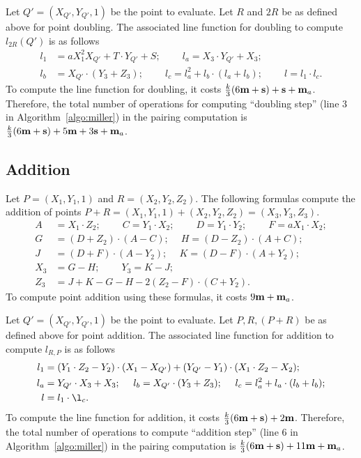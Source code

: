 Let $Q' = (X_{Q'}, Y_{Q'}, 1)$ be the point to evaluate.
Let $R$ and $2R$ be as defined above for point doubling.
The associated line function for doubling
to compute $l_{2R}(Q')$ is as follows
\begin{align*}
l_1 &= a X_1^2 X_{Q'} + T \cdot Y_{Q'} + S;\		\qquad
l_a = X_3 \cdot Y_{Q'} + X_3;			\\
l_b &= X_{Q'} \cdot (Y_3 + Z_3);\			\qquad
l_c = l_a^2 + l_b \cdot (l_a + l_b);\		\qquad
l = l_1 \cdot l_c.
\end{align*}
To compute the line function for doubling,
it costs 
$\frac{k}{3}(6\textbf{m} + \textbf{s}) + \textbf{s} + \textbf{m}_{a}$. %
Therefore, the total number of operations for computing ``doubling step''
({line 3} in Algorithm~\ref{algo:miller}) in the pairing computation is
$\frac{k}{3}(6\textbf{m} + \textbf{s}) + 5\textbf{m} +3\textbf{s} + \textbf{m}_{a}$. %



\subsection{Addition}
Let $P = (X_1,Y_1,1)$ and $R = (X_2,Y_2,Z_2)$.
The following formulas compute the addition of points
$P + R = (X_1,Y_1,1) + (X_2,Y_2,Z_2) = (X_3,Y_3,Z_3)$.
\begin{align*}
A &= X_1 \cdot Z_2;\	\qquad
C = Y_1 \cdot X_2;\	\qquad
D = Y_1 \cdot Y_2;\	\qquad
F = a X_1 \cdot X_2;\\
G &= (D + Z_2) \cdot (A - C);\	\quad
H = (D - Z_2) \cdot (A + C);\\
J &= (D + F) \cdot (A - Y_2);\	\quad
K = (D - F) \cdot (A + Y_2);\\
X_3 &= G - H;\	\qquad
Y_3 = K - J;\\
Z_3 &= J + K - G - H - 2(Z_2 - F) \cdot (C + Y_2).
\end{align*}
To compute point addition using these formulas,
it costs $9\textbf{m} + \textbf{m}_{a}$. %

Let $Q' = (X_{Q'},Y_{Q'},1)$ be the point to evaluate.
Let $P,R,(P+R)$ be as defined above for point addition.
The associated line function for addition
to compute $l_{R,P}$ is as follows
\begin{align*}
l_1 &= (Y_1 \cdot Z_2 - Y_2) \cdot (X_1 - X_{Q'}) + (Y_{Q'} - Y_1) \cdot (X_1 \cdot Z_2 - X_2);\\
l_a &= Y_{Q'} \cdot X_3 + X_3;\	\quad
l_b = X_{Q'} \cdot (Y_3 + Z_3);\	\quad
l_c = l_a^2 + l_a \cdot (l_b + l_b);\\
l &= l_1 \cdot \l_c.
\end{align*}
To compute the line function for addition,
it costs
$\frac{k}{3}(6\textbf{m} + \textbf{s}) + 2\textbf{m}$. %
Therefore, the total number of operations to compute ``addition step''
({line 6} in Algorithm~\ref{algo:miller}) in the pairing computation is
$\frac{k}{3}(6\textbf{m} + \textbf{s}) + 11\textbf{m} + \textbf{m}_{a}$. %



